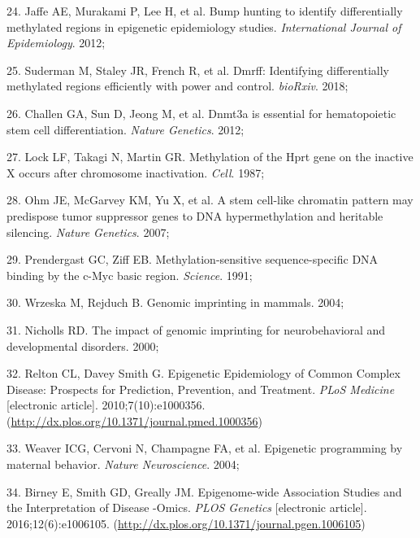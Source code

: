 \documentclass[11pt,twoside]{bristolthesis}
\newenvironment{cslreferences}%
  {}%
  {\par}
\begin{document}
\begin{cslreferences}
\leavevmode\hypertarget{ref-Jaffe2012}{}%
24. Jaffe AE, Murakami P, Lee H, et al. Bump hunting to identify differentially methylated regions in epigenetic epidemiology studies. \emph{International Journal of Epidemiology}. 2012;

\leavevmode\hypertarget{ref-Suderman2018}{}%
25. Suderman M, Staley JR, French R, et al. Dmrff: Identifying differentially methylated regions efficiently with power and control. \emph{bioRxiv}. 2018;

\leavevmode\hypertarget{ref-Challen2012}{}%
26. Challen GA, Sun D, Jeong M, et al. Dnmt3a is essential for hematopoietic stem cell differentiation. \emph{Nature Genetics}. 2012;

\leavevmode\hypertarget{ref-Lock1987}{}%
27. Lock LF, Takagi N, Martin GR. Methylation of the Hprt gene on the inactive X occurs after chromosome inactivation. \emph{Cell}. 1987;

\leavevmode\hypertarget{ref-Ohm2007}{}%
28. Ohm JE, McGarvey KM, Yu X, et al. A stem cell-like chromatin pattern may predispose tumor suppressor genes to DNA hypermethylation and heritable silencing. \emph{Nature Genetics}. 2007;

\leavevmode\hypertarget{ref-Prendergast1991}{}%
29. Prendergast GC, Ziff EB. Methylation-sensitive sequence-specific DNA binding by the c-Myc basic region. \emph{Science}. 1991;

\leavevmode\hypertarget{ref-Wrzeska2004}{}%
30. Wrzeska M, Rejduch B. Genomic imprinting in mammals. 2004;

\leavevmode\hypertarget{ref-Nicholls2000}{}%
31. Nicholls RD. The impact of genomic imprinting for neurobehavioral and developmental disorders. 2000;

\leavevmode\hypertarget{ref-Relton2010}{}%
32. Relton CL, Davey Smith G. Epigenetic Epidemiology of Common Complex Disease: Prospects for Prediction, Prevention, and Treatment. \emph{PLoS Medicine} {[}electronic article{]}. 2010;7(10):e1000356. (\url{http://dx.plos.org/10.1371/journal.pmed.1000356})

\leavevmode\hypertarget{ref-Weaver2004}{}%
33. Weaver ICG, Cervoni N, Champagne FA, et al. Epigenetic programming by maternal behavior. \emph{Nature Neuroscience}. 2004;

\leavevmode\hypertarget{ref-Birney2016}{}%
34. Birney E, Smith GD, Greally JM. Epigenome-wide Association Studies and the Interpretation of Disease -Omics. \emph{PLOS Genetics} {[}electronic article{]}. 2016;12(6):e1006105. (\url{http://dx.plos.org/10.1371/journal.pgen.1006105})


\end{cslreferences}
\end{document}
